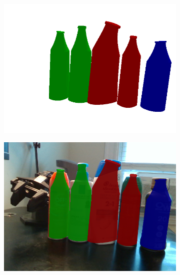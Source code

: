 \documentclass{article}
\begin{document}
\begin{figure}[]
\begin{subfigure}{(\linewidth - 0.05\linewidth)/5}
        \includegraphics[width=\linewidth]{figures/real2sim2real/4/3_sim.png}
    \end{subfigure}
    \begin{subfigure}{(\linewidth - 0.05\linewidth)/5}
        \centering
        \includegraphics[width=\linewidth]{figures/real2sim2real/4/3.png}
    \end{subfigure}
    \begin{subfigure}{(\linewidth - 0.05\linewidth)/5}
        \centering

\end{subfigure}
\end{figure}
\end{document}
